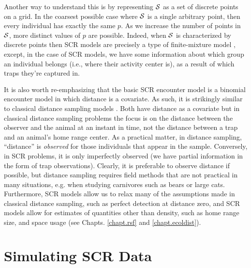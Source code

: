 Another way to understand this is by representing ${\cal S}$ as a set
of discrete points on a grid. In the coarsest possible case where
${\cal S}$ is a single arbitrary point, then every individual has
exactly the same $p$. As we increase the number of points in ${\cal
  S}$,  more distinct values of $p$ are possible. Indeed, when
${\cal S}$ is characterized by discrete points then SCR models are
precisely a type of finite-mixture model \citep{norris_pollock:1996,
  pledger:2000}, except, in the case of SCR models, we have some information about which
group an individual belongs (i.e., where their activity center is), as
a result of which traps they're captured in.

It is also worth re-emphasizing that the basic SCR encounter model is a binomial
encounter model in which distance is a covariate. As such, it is
strikingly similar to classical distance sampling models
\citep{buckland_etal:2001}. Both have distance as a covariate but in
classical distance sampling problems the focus is on the distance
between the observer and the animal at an instant in time, not the
distance between a trap and an animal's home range center. As a
practical matter, in distance sampling, ``distance'' is {\it observed}
for those individuals that appear in the sample. Conversely, in SCR
problems, it is only imperfectly observed (we have partial information
in the form of trap observations).  Clearly, it is preferable to
observe distance if possible, but distance sampling requires field
methods that are not practical in many situations, e.g. when
studying carnivores such as bears or large cats. Furthermore, SCR
models allow us to relax many of the assumptions made in classical
distance sampling, such as perfect detection at distance zero, and SCR
models allow for estimates of quantities other than density, such as
home range size, and space usage (see Chapts. \ref{chapt.rsf} and
\ref{chapt.ecoldist}).


\section{Simulating SCR Data}
\label{scr0.sec.simulating}

